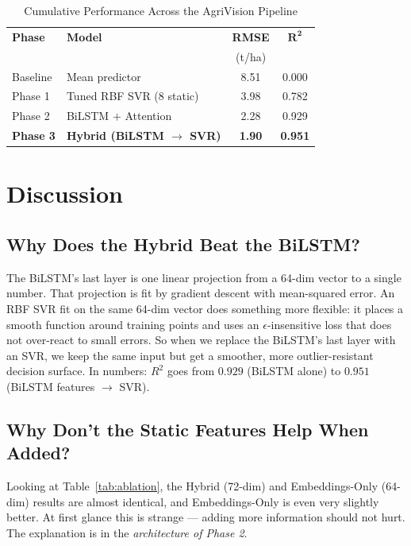 \documentclass[conference]{IEEEtran}
\begin{document}
\begin{table}[H]
\caption{Cumulative Performance Across the AgriVision Pipeline}
\label{tab:crossphase}
\centering
\begin{tabular}{llcc}
\toprule
\textbf{Phase} & \textbf{Model}              & \textbf{RMSE} & $\mathbf{R^{2}}$ \\
               &                              & (t/ha)        & \\
\midrule
Baseline       & Mean predictor               & 8.51 & 0.000 \\
Phase 1        & Tuned RBF SVR (8 static)     & 3.98 & 0.782 \\
Phase 2        & BiLSTM $+$ Attention         & 2.28 & 0.929 \\
\textbf{Phase 3} & \textbf{Hybrid (BiLSTM $\!\to\!$ SVR)} & \textbf{1.90} & \textbf{0.951} \\
\bottomrule
\end{tabular}
\end{table}

\section{Discussion}
\label{sec:discussion}

\subsection{Why Does the Hybrid Beat the BiLSTM?}
The BiLSTM's last layer is one linear projection from a 64-dim vector to a single number. That projection is fit by gradient descent with mean-squared error. An RBF SVR fit on the same 64-dim vector does something more flexible: it places a smooth function around training points and uses an $\epsilon$-insensitive loss that does not over-react to small errors. So when we replace the BiLSTM's last layer with an SVR, we keep the same input but get a smoother, more outlier-resistant decision surface. In numbers: $R^{2}$ goes from $0.929$ (BiLSTM alone) to $0.951$ (BiLSTM features $\rightarrow$ SVR).

\subsection{Why Don't the Static Features Help When Added?}
Looking at Table~\ref{tab:ablation}, the Hybrid (72-dim) and Embeddings-Only (64-dim) results are almost identical, and Embeddings-Only is even very slightly better. At first glance this is strange — adding more information should not hurt. The explanation is in the \emph{architecture of Phase 2}.
\end{document}
